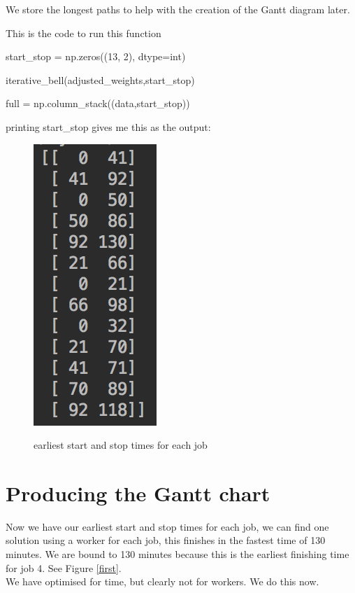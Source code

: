 \documentclass[paper=a4, fontsize=12pt]{scrartcl} %
\numberwithin{equation}{section}       %
\numberwithin{figure}{section}         %
\numberwithin{table}{section}          %
\begin{document}
We store the longest paths to help with the creation of the Gantt diagram later.

This is the code to run this function

\begin{python}
    start_stop = np.zeros((13, 2), dtype=int)

    iterative_bell(adjusted_weights,start_stop)

    full = np.column_stack((data,start_stop))
\end{python}

printing start\_stop gives me this as the output:

\begin{figure}[h]
\caption{earliest start and stop times for each job}
\centering
\includegraphics[scale=0.8]{lists}\label{startst}
\end{figure}

\section{Producing the Gantt chart}

Now we have our earliest start and stop times for each job, we can find one solution using a worker for each job, this finishes in the fastest time of 130 minutes. We are bound to 130 minutes because this is the earliest finishing time for job 4. See Figure \ref{first}.\\
We have optimised for time, but clearly not for workers. We do this now. \\
\end{document}
